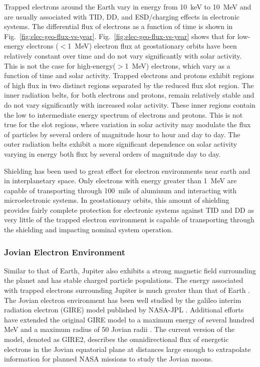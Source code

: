 Trapped electrons around the Earth vary in energy from 10~keV to 10~MeV and are usually associated with TID, DD, and ESD/charging effects in electronic systems.
The differential flux of electrons as a function of time is shown in Fig.~\ref{fig:elec-geo-flux-vs-year}.
Fig.~\ref{fig:elec-geo-flux-vs-year} shows that for low-energy electrons ($<$1~MeV) electron flux at geostationary orbits have been relatively constant over time and do not vary significantly with solar activity.
This is not the case for high-energy($>$1~MeV) electrons, which vary as a function of time and solar activity.
Trapped electrons and protons exhibit regions of high flux in two distinct regions separated by the reduced flux slot region.
The inner radiation belts, for both electrons and protons, remain relatively stable and do not vary significantly with increased solar activity.
These inner regions contain the low to intermediate energy spectrum of electrons and protons.
This is not true for the slot regions, where variation in solar activity may  modulate the flux of particles by several orders of magnitude hour to hour and day to day.
The outer radiation belts exhibit a more significant dependence on solar activity varying in energy both flux by several orders of magnitude day to day.

Shielding has been used to great effect for electron environments near earth and in interplanetary space.
Only electrons with energy greater than 1~MeV are capable of transporting through 100~mils of aluminum and interacting with microelectronic systems.
In geostationary orbits, this amount of shielding provides fairly complete protection for electronic systems against TID and DD as very little of the trapped electron environment is capable of transporting through the shielding and impacting nominal system operation.

\subsubsection{Jovian Electron Environment} %
\label{sub:jovian_environment}
Similar to that of Earth, Jupiter also exhibits a strong magnetic field surrounding the planet and has stable charged particle populations.
The energy associated with trapped electrons surrounding Jupiter is much greater than that of Earth \cite{divine1983charged,garrett2012galileo}.
The Jovian electron environment has been well studied by the galileo interim radiation electron (GIRE) model published by NASA-JPL \cite{divine1983charged}.
Additional efforts have extended the original GIRE model to a maximum energy of several hundred MeV and a maximum radius of 50 Jovian radii \cite{garrett2003galileo,garrett2005revised}.
The current version of the model, denoted as GIRE2, describes the omnidirectional flux of energetic electrons in the Jovian equatorial plane at distances large enough to extrapolate information for planned NASA missions to study the Jovian moons.

